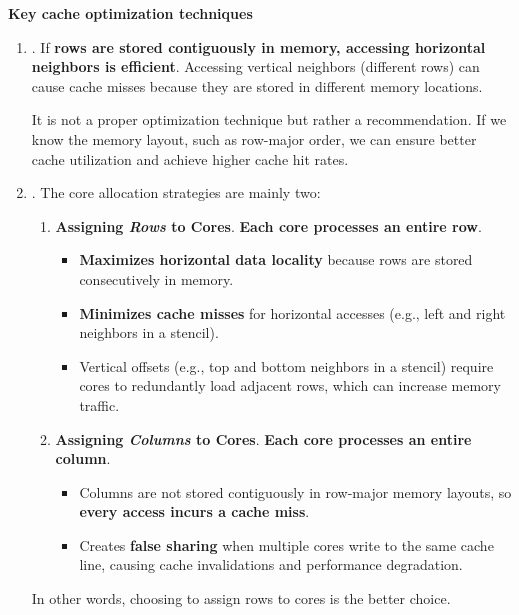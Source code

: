 \highspace
\begin{flushleft}
    \textcolor{Green3}{\faIcon{\speedIcon} \textbf{Key cache optimization techniques}}
\end{flushleft}
\begin{enumerate}
    \item {}. If \textbf{rows are stored contiguously in memory, accessing horizontal neighbors is efficient}. Accessing vertical neighbors (different rows) can cause cache misses because they are stored in different memory locations.
    
    It is not a proper optimization technique but rather a recommendation. If we know the memory layout, such as row-major order, we can ensure better cache utilization and achieve higher cache hit rates.
    
    
    \item {}. The core allocation strategies are mainly two:
    \begin{enumerate}
        \item \textcolor{Green3}{\textbf{Assigning \emph{Rows} to Cores}}. \textbf{Each core processes an entire row}.
        \begin{itemize}
            \item[\textcolor{Green3}{\faIcon{check}}] \textbf{Maximizes horizontal data locality} because rows are stored consecutively in memory.
            \item[\textcolor{Green3}{\faIcon{check}}] \textbf{Minimizes cache misses} for horizontal accesses (e.g., left and right neighbors in a stencil).
            \item[\textcolor{Red2}{\faIcon{times}}] Vertical offsets (e.g., top and bottom neighbors in a stencil) require cores to redundantly load adjacent rows, which can increase memory traffic.
        \end{itemize}

        \item \textcolor{Red2}{\textbf{Assigning \emph{Columns} to Cores}}. \textbf{Each core processes an entire column}.
        \begin{itemize}[label=\textcolor{Red2}{}]
            \item Columns are not stored contiguously in row-major memory layouts, so \textbf{every access incurs a cache miss}.
            \item Creates \textbf{false sharing} when multiple cores write to the same cache line, causing cache invalidations and performance degradation.
        \end{itemize}
    \end{enumerate}
    In other words, choosing to assign rows to cores is the better choice.
    

\end{enumerate}
